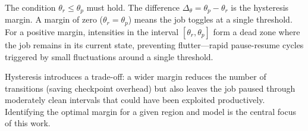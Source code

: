 The condition $\theta_r \le \theta_p$ must hold.  The difference $\Delta_\theta
= \theta_p - \theta_r$ is the hysteresis margin.  A margin of zero
($\theta_r = \theta_p$) means the job toggles at a single threshold.  For a
positive margin, intensities in the interval $[\theta_r, \theta_p]$ form a dead
zone where the job remains in its current state, preventing flutter---rapid
pause-resume cycles triggered by small fluctuations around a single threshold.

Hysteresis introduces a trade-off: a wider margin reduces the number of
transitions (saving checkpoint overhead) but also leaves the job paused through
moderately clean intervals that could have been exploited productively.
Identifying the optimal margin for a given region and model is the central
focus of this work.
